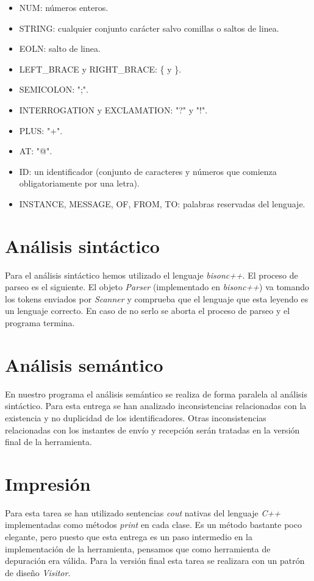 \documentclass{article}
\begin{document}
\begin{itemize}
\item NUM: números enteros.
\item STRING: cualquier conjunto carácter salvo comillas o saltos de linea.
\item EOLN: salto de linea.
\item LEFT\_BRACE y RIGHT\_BRACE: \{ y \}.
\item SEMICOLON: ";".
\item INTERROGATION y EXCLAMATION: "?" y "!".
\item PLUS: "+".
\item AT: "@".
\item ID: un identificador (conjunto de caracteres y números que comienza obligatoriamente por una letra).
\item INSTANCE, MESSAGE, OF, FROM, TO: palabras reservadas del lenguaje.
\end{itemize}

\section{Análisis sintáctico}

Para el análisis sintáctico hemos utilizado el lenguaje \textit{bisonc++}. El proceso de parseo es el siguiente. El objeto \textit{Parser} (implementado en \textit{bisonc++}) va tomando los tokens enviados por \textit{Scanner} y comprueba que el lenguaje que esta leyendo es un lenguaje correcto. En caso de no serlo se aborta el proceso de parseo y el programa termina.

\section{Análisis semántico}

En nuestro programa el análisis semántico se realiza de forma paralela al análisis sintáctico. Para esta entrega se han analizado inconsistencias relacionadas con la existencia y no duplicidad de los identificadores. Otras inconsistencias relacionadas con los instantes de envío y recepción serán tratadas en la versión final de la herramienta. 

\section{Impresión}

Para esta tarea se han utilizado sentencias \textit{cout} nativas del lenguaje \textit{C++} implementadas como métodos \textit{print} en cada clase. Es un método bastante poco elegante, pero puesto que esta entrega es un paso intermedio en la implementación de la herramienta, pensamos que como herramienta de depuración era válida. Para la versión final esta tarea se realizara con un patrón de diseño \textit{Visitor}.
\end{document}
